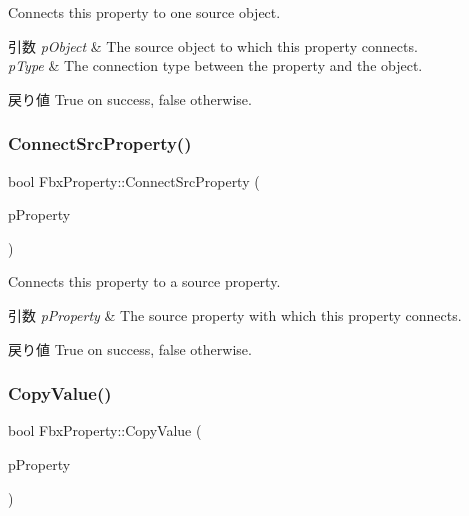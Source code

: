 Connects this property to one source object. 
\begin{DoxyParams}{引数}
{\em p\+Object} & The source object to which this property connects. \\
\hline
{\em p\+Type} & The connection type between the property and the object. \\
\hline
\end{DoxyParams}
\begin{DoxyReturn}{戻り値}
{\ttfamily True} on success, {\ttfamily false} otherwise. 
\end{DoxyReturn}
\mbox{\label{class_fbx_property_aeeed658a70181e4bd6030c516065eb03}} 
\subsubsection{\texorpdfstring{Connect\+Src\+Property()}{ConnectSrcProperty()}}
{\footnotesize\ttfamily bool Fbx\+Property\+::\+Connect\+Src\+Property (\begin{DoxyParamCaption}\item[{const \hyperlink{class_fbx_property}{Fbx\+Property} \&}]{p\+Property }\end{DoxyParamCaption})}

Connects this property to a source property. 
\begin{DoxyParams}{引数}
{\em p\+Property} & The source property with which this property connects. \\
\hline
\end{DoxyParams}
\begin{DoxyReturn}{戻り値}
{\ttfamily True} on success, {\ttfamily false} otherwise. 
\end{DoxyReturn}
\mbox{\label{class_fbx_property_aadee6392924e168e7cfea5225148893a}} 
\subsubsection{\texorpdfstring{Copy\+Value()}{CopyValue()}}
{\footnotesize\ttfamily bool Fbx\+Property\+::\+Copy\+Value (\begin{DoxyParamCaption}\item[{const \hyperlink{class_fbx_property}{Fbx\+Property} \&}]{p\+Property }\end{DoxyParamCaption})}

